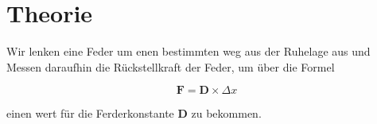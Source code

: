 \section{Theorie}
\label{sec:Theorie}


Wir lenken eine Feder um enen bestimmten weg aus der Ruhelage aus 
und Messen daraufhin die Rückstellkraft der Feder, um über die 
Formel

\begin{equation}
    \symbf{F} = \symbf{D} \times \Delta x 
    \label{eq:example}
\end{equation}

einen wert für die Ferderkonstante $\symbf{D}$ zu bekommen.

